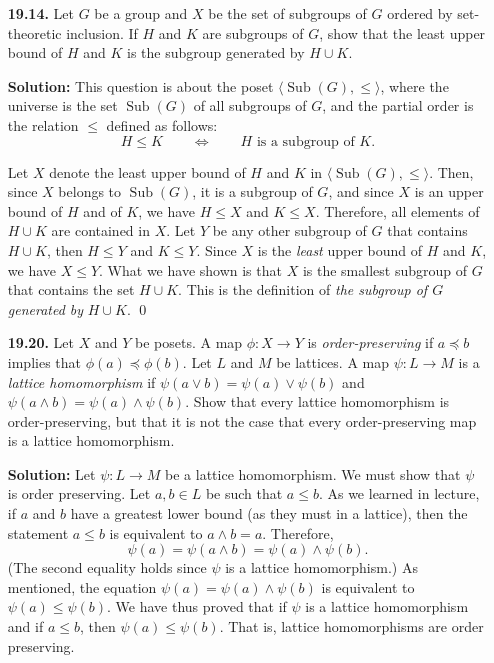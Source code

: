 \documentclass[12pt,reqno]{amsart}
\newcommand{\meet}{\ensuremath{\wedge}}
\newcommand{\boldemph}{\emph}
\newcommand{\Sub}{\ensuremath{\operatorname{Sub}}}
\renewcommand{\>}{\ensuremath{\rangle}}
\newcommand{\<}{\ensuremath{\langle}}
\newcommand{\probskip}{\vskip1cm}
\begin{document}
\begin{enumerate}[{\bf 1.}]
\begin{center}
\begin{tikzpicture}[scale=0.75]
\end{tikzpicture}
\end{center}

\probskip

\item[{\bf 19.14.}] 
Let $G$ be a group and $X$ be the set of subgroups of $G$ ordered by
set-theoretic inclusion. If $H$ and $K$ are subgroups of $G$, show
that the least upper bound of $H$ and $K$ is the subgroup generated by
$H \cup K$. 
 
\bigskip
\noindent
{\bf Solution:} This question is about the poset $\< \Sub(G), \leq\>$, where the
universe is the set $\Sub(G)$ of all subgroups of $G$, and the partial order is
the relation $\leq$ defined as follows: 
\[
H \leq K \qquad \Longleftrightarrow \qquad \text{$H$ is a subgroup of $K$.}
\]  

Let $X$ denote the least upper
bound of $H$ and $K$ in $\< \Sub(G), \leq\>$. Then, since $X$ belongs to
$\Sub(G)$, it is a subgroup of $G$, and since $X$  is an upper bound of $H$
and of $K$, we have $H\leq X$ and $K \leq X$.  Therefore, all elements of 
$H\cup K$ are contained in $X$.  Let $Y$ be any other subgroup of $G$
that contains $H \cup K$, then $H\leq Y$ and $K \leq Y$. Since $X$ is the
\emph{least} upper bound of $H$ and $K$, we have $X \leq Y$.  What we have shown
is that $X$ is the smallest subgroup of $G$ that contains the set $H\cup K$.
This is the definition of \emph{the subgroup of $G$ generated by} $H\cup K$.
\qed
\probskip
 
\item[{\bf 19.20.}] 
Let $X$ and $Y$ be posets.  A map $\phi : X \rightarrow Y$ is \boldemph{
order-preserving} if $a \preceq b$
implies that $\phi(a) \preceq \phi(b)$.  Let $L$ and $M$ be lattices.
A map $\psi: L \rightarrow M$ is a \boldemph{lattice
homomorphism}
if $\psi( a \vee b ) = \psi(a) \vee \psi(b)$ and $\psi( a \wedge b ) =
\psi(a) \wedge \psi(b)$. Show that every lattice homomorphism is
order-preserving, but that it is not the case that every
order-preserving map is a lattice homomorphism.  
 
\bigskip
\noindent
{\bf Solution:}
Let $\psi: L \rightarrow M$ be a lattice homomorphism.  We must show that $\psi$
is order preserving.  Let $a, b\in L$ be such that $a\leq b$.  As we learned in
lecture, if $a$ and $b$ have a greatest lower bound (as they must in a lattice),
then the statement $a\leq b$ is equivalent to $a\meet b = a$. Therefore,  
\begin{equation*}
\psi(a) = \psi(a \meet b)  = \psi(a) \meet \psi(b).
\end{equation*}
(The second equality holds since $\psi$ is a lattice homomorphism.)
As mentioned, the equation $\psi(a) = \psi(a) \meet \psi(b)$ 
is equivalent to $\psi(a) \leq \psi(b)$.  We have thus proved that if $\psi$ is
a lattice homomorphism and if $a\leq b$, then $\psi(a) \leq \psi(b)$.  That is,
lattice homomorphisms are order preserving.


\end{enumerate}
\end{document}
